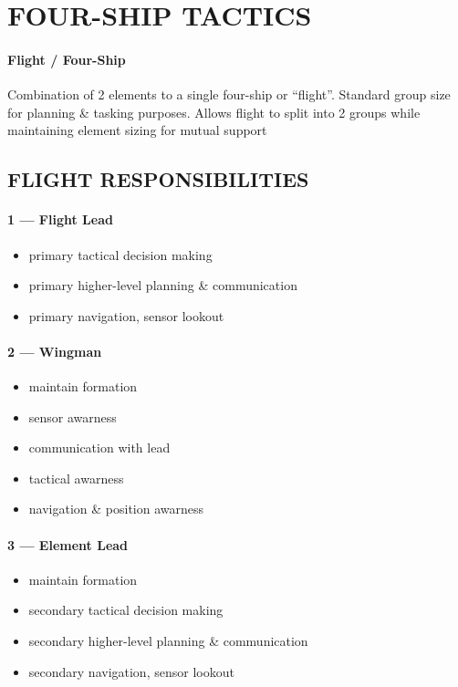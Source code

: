 \section{FOUR-SHIP TACTICS}
\label{sec:ttp_aa:tactics_4ship}

\paragraph{Flight / Four-Ship}
Combination of 2 elements to a single four-ship or ``flight''.
Standard group size for planning \& tasking purposes. 
Allows flight to split into 2 groups while maintaining element sizing for mutual support

\subsection{FLIGHT RESPONSIBILITIES}

\paragraph{1 --- Flight Lead}
\begin{itemize}
    \item primary tactical decision making
    \item primary higher-level planning \& communication
    \item primary navigation, sensor lookout
\end{itemize}

\paragraph{2 --- Wingman}
\begin{itemize}
    \item maintain formation
    \item sensor awarness
    \item communication with lead
    \item tactical awarness
    \item navigation \& position awarness
\end{itemize}

\paragraph{3 --- Element Lead}
\begin{itemize}
    \item maintain formation
    \item secondary tactical decision making
    \item secondary higher-level planning \& communication
    \item secondary navigation, sensor lookout
\end{itemize}

